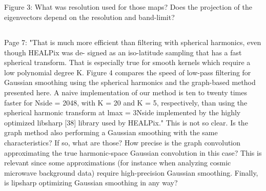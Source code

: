 \documentclass[12pt,a4paper]{article}
\newcommand{\todo}[1]{{\color[rgb]{.6,.1,.6}{TODO: #1}}}
\begin{document}
\subsection{}

\begin{mdframed}[style=comment] 
Figure 3: What was resolution used for those maps? Does the projection of the eigenvectors depend on the resolution and band-limit? 
\end{mdframed}

\todo{Answer}

\subsection{}
\begin{mdframed}[style=comment] 
Page 7: "That is much more efficient than filtering with spherical harmonics, even though HEALPix was de- signed as an iso-latitude sampling that has a fast spherical transform. That is especially true for smooth kernels which require a low polynomial degree K. Figure 4 compares the speed of low-pass filtering for Gaussian smoothing using the spherical harmonics and the graph-based method presented here. A naive implementation of our method is ten to twenty times faster for Nside = 2048, with K = 20 and K = 5, respectively, than using the spherical harmonic transform at lmax = 3Nside implemented by the highly optimized libsharp [38] library used by HEALPix." This is not so clear. Is the graph method also performing a Gaussian smoothing with the same characteristics? If so, what are those? How precise is the graph convolution approximating the true harmonic-space Gaussian convolution in this case? This is relevant since some approximations (for instance when analyzing cosmic microwave background data) require high-precision Gaussian smoothing. Finally, is lipsharp optimizing Gaussian smoothing in any way?
\end{mdframed}
\todo{Answer}

\section{}
\end{document}
